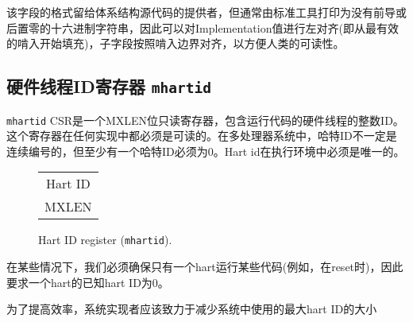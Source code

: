 该字段的格式留给体系结构源代码的提供者，但通常由标准工具打印为没有前导或后置零的十六进制字符串，因此可以对Implementation值进行左对齐(即从最有效的啃入开始填充)，子字段按照啃入边界对齐，以方便人类的可读性。

\subsection{硬件线程ID寄存器 {\tt mhartid}}
\iffalse
The {\tt mhartid} CSR is an MXLEN-bit read-only register
containing the integer ID of the hardware thread running the code.
This register must be readable in any implementation.  Hart IDs might
not necessarily be numbered contiguously in a multiprocessor system,
but at least one hart must have a hart ID of zero.  Hart IDs must be
unique within the execution environment.
\fi

 {\tt mhartid} CSR是一个MXLEN位只读寄存器，包含运行代码的硬件线程的整数ID。这个寄存器在任何实现中都必须是可读的。在多处理器系统中，哈特ID不一定是连续编号的，但至少有一个哈特ID必须为0。Hart id在执行环境中必须是唯一的。

\begin{figure*}[h!]
{\footnotesize
\begin{center}
\begin{tabular}{J}
 \\
\hline
{}\\
\hline
MXLEN \\
\end{tabular}
\end{center}
}
\vspace{-0.1in}
\caption{Hart ID register ({\tt mhartid}).}
\label{mhartidreg}
\end{figure*}

\iffalse
\begin{commentary}
In certain cases, we must ensure exactly one hart runs some code
(e.g., at reset), and so require one hart to have a known hart ID of
zero.

For efficiency, system implementers should aim to reduce the magnitude
of the largest hart ID used in a system.
\end{commentary}
\fi

\begin{commentary}
在某些情况下，我们必须确保只有一个hart运行某些代码(例如，在reset时)，因此要求一个hart的已知hart ID为0。

为了提高效率，系统实现者应该致力于减少系统中使用的最大hart ID的大小
\end{commentary}

